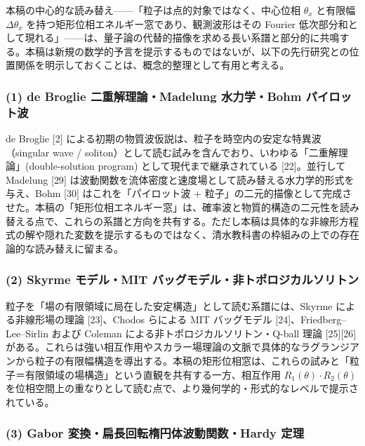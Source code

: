 \documentclass[
]{ltjsarticle}
\begin{document}
本稿の中心的な読み替え------「粒子は点的対象ではなく、中心位相
\(\theta_x\) と有限幅 \(\Delta\theta_x\)
を持つ矩形位相エネルギー窓であり、観測波形はその Fourier
低次部分和として現れる」------は、量子論の代替的描像を求める長い系譜と部分的に共鳴する。本稿は新規の数学的予言を提示するものではないが、以下の先行研究との位置関係を明示しておくことは、概念的整理として有用と考える。

\subsubsection{(1) de Broglie 二重解理論・Madelung 水力学・Bohm
パイロット波}\label{de-broglie-ux4e8cux91cdux89e3ux7406ux8ad6madelung-ux6c34ux529bux5b66bohm-ux30d1ux30a4ux30edux30c3ux30c8ux6ce2}

de Broglie {[}2{]}
による初期の物質波仮説は、粒子を時空内の安定な特異波（singular wave /
soliton）として読む試みを含んでおり、いわゆる「二重解理論」(double-solution
program) として現代まで継承されている {[}22{]}。並行して Madelung
{[}29{]}
は波動関数を流体密度と速度場として読み替える水力学的形式を与え、Bohm
{[}30{]} はこれを「パイロット波 +
粒子」の二元的描像として完成させた。本稿の「矩形位相エネルギー窓」は、確率波と物質的構造の二元性を読み替える点で、これらの系譜と方向を共有する。ただし本稿は具体的な非線形方程式の解や隠れた変数を提示するものではなく、清水教科書の枠組みの上での存在論的な読み替えに留まる。

\subsubsection{(2) Skyrme モデル・MIT
バッグモデル・非トポロジカルソリトン}\label{skyrme-ux30e2ux30c7ux30ebmit-ux30d0ux30c3ux30b0ux30e2ux30c7ux30ebux975eux30c8ux30ddux30edux30b8ux30abux30ebux30bdux30eaux30c8ux30f3}

粒子を「場の有限領域に局在した安定構造」として読む系譜には、Skyrme
による非線形場の理論 {[}23{]}、Chodos らによる MIT バッグモデル
{[}24{]}、Friedberg--Lee--Sirlin および Coleman
による非トポロジカルソリトン・Q-ball 理論 {[}25{]}{[}26{]}
がある。これらは強い相互作用やスカラー場理論の文脈で具体的なラグランジアンから粒子の有限幅構造を導出する。本稿の矩形位相窓は、これらの試みと「粒子＝有限領域の場構造」という直観を共有する一方、相互作用
\(R_1(\theta) \cdot R_2(\theta)\)
を位相空間上の重なりとして読む点で、より幾何学的・形式的なレベルで提示されている。

\subsubsection{(3) Gabor 変換・扁長回転楕円体波動関数・Hardy
定理}\label{gabor-ux5909ux63dbux6241ux9577ux56deux8ee2ux6955ux5186ux4f53ux6ce2ux52d5ux95a2ux6570hardy-ux5b9aux7406}
\end{document}
